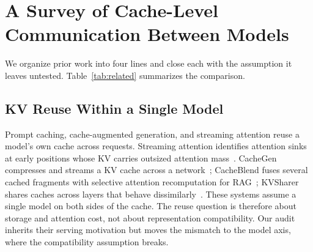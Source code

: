 \documentclass[10pt]{article}
\begin{document}
\section{A Survey of Cache-Level Communication Between Models}
\label{sec:survey}

We organize prior work into four lines and close each with the assumption it
leaves untested. Table~\ref{tab:related} summarizes the comparison.

\subsection{KV Reuse Within a Single Model}
Prompt caching, cache-augmented generation, and streaming attention reuse a
model's own cache across requests. Streaming attention identifies attention
sinks at early positions whose KV carries outsized attention
mass~\citep{streamingsink2023}. CacheGen compresses and streams a KV cache
across a network~\citep{cachegen2024}; CacheBlend fuses several cached
fragments with selective attention recomputation for
RAG~\citep{cacheblend2025}; KVSharer shares caches across layers that behave
dissimilarly~\citep{kvsharer2024}. These systems assume a single model on
both sides of the cache. The reuse question is therefore about storage and
attention cost, not about representation compatibility. Our audit inherits
their serving motivation but moves the mismatch to the model axis, where the
compatibility assumption breaks.
\end{document}
